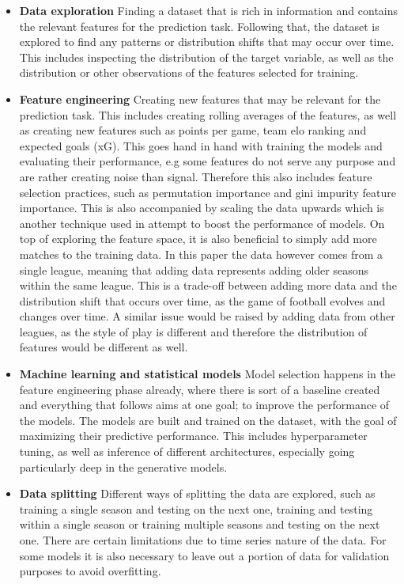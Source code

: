 \documentclass{article}
\begin{document}
\begin{itemize}
    \item \textbf{Data exploration} Finding a dataset that is rich in information and contains the relevant features for the prediction task. Following that, the dataset is explored to find any patterns or distribution shifts that may occur over time. This includes inspecting the distribution of the target variable, as well as the distribution or other observations of the features selected for training.
    \item \textbf{Feature engineering} Creating new features that may be relevant for the prediction task. This includes creating rolling averages of the features, as well as creating new features such as points per game, team elo ranking and expected goals (xG). This goes hand in hand with training the models and evaluating their performance, e.g some features do not serve any purpose and are rather creating noise than signal. Therefore this also includes feature selection practices, such as permutation importance and gini impurity feature importance. This is also accompanied by scaling the data upwards which is another technique used in attempt to boost the performance of models. On top of exploring the feature space, it is also beneficial to simply add more matches to the training data. In this paper the data however comes from a single league, meaning that adding data represents adding older seasons within the same league. This is a trade-off between adding more data and the distribution shift that occurs over time, as the game of football evolves and changes over time. A similar issue would be raised by adding data from other leagues, as the style of play is different and therefore the distribution of features would be different as well.
    \item \textbf{Machine learning and statistical models} Model selection happens in the feature engineering phase already, where there is sort of a baseline created and everything that follows aims at one goal; to improve the performance of the models. The models are built and trained on the dataset, with the goal of maximizing their predictive performance. This includes hyperparameter tuning, as well as inference of different architectures, especially going particularly deep in the generative models.
    \item \textbf{Data splitting} Different ways of splitting the data are explored, such as training a single season and testing on the next one, training and testing within a single season or training multiple seasons and testing on the next one. There are certain limitations due to time series nature of the data. For some models it is also necessary to leave out a portion of data for validation purposes to avoid overfitting.

\end{itemize}
\end{document}
